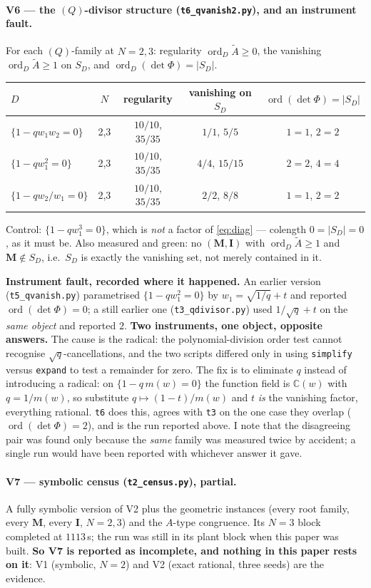 \documentclass[11pt]{article}
\theoremstyle{definition}
\newcommand{\At}{\widetilde{A}}
\newcommand{\bM}{\mathbf{M}}
\newcommand{\bI}{\mathbf{I}}
\newcommand{\ord}{\operatorname{ord}}
\begin{document}
\paragraph{V6 --- the $(Q)$-divisor structure (\texttt{t6\_qvanish2.py}), and an
instrument fault.}
For each $(Q)$-family at $N=2,3$: regularity $\ord_D\At\ge0$, the vanishing
$\ord_D\At\ge1$ on $S_D$, and $\ord_D(\det\Phi)=|S_D|$.
\begin{center}
\begin{tabular}{lcccc}
\toprule
$D$ & $N$ & regularity & vanishing on $S_D$ & $\ord(\det\Phi)=|S_D|$\\\midrule
$\{1-qw_1w_2=0\}$ & 2,3 & $10/10$, $35/35$ & $1/1$, $5/5$ & $1=1$, $2=2$\\
$\{1-qw_1^{2}=0\}$ & 2,3 & $10/10$, $35/35$ & $4/4$, $15/15$ & $2=2$, $4=4$\\
$\{1-qw_2/w_1=0\}$ & 2,3 & $10/10$, $35/35$ & $2/2$, $8/8$ & $1=1$, $2=2$\\
\bottomrule
\end{tabular}
\end{center}
Control: $\{1-qw_1^{3}=0\}$, which is \emph{not} a factor of \eqref{eq:diag} ---
colength $0=|S_D|=0$, as it must be.  Also measured and green: no $(\bM,\bI)$
with $\ord_D\At\ge1$ and $\bM\notin S_D$, i.e.\ $S_D$ is exactly the vanishing
set, not merely contained in it.

\textbf{Instrument fault, recorded where it happened.}  An earlier version
(\texttt{t5\_qvanish.py}) parametrised $\{1-qw_1^{2}=0\}$ by
$w_1=\sqrt{1/q}+t$ and reported $\ord(\det\Phi)=0$; a still earlier one
(\texttt{t3\_qdivisor.py}) used $1/\sqrt q+t$ on the \emph{same object} and
reported $2$.  \textbf{Two instruments, one object, opposite answers.}  The cause
is the radical: the polynomial-division order test cannot recognise
$\sqrt q$-cancellations, and the two scripts differed only in using
\texttt{simplify} versus \texttt{expand} to test a remainder for zero.  The fix
is to eliminate $q$ instead of introducing a radical: on $\{1-q\,m(w)=0\}$ the
function field is $\mathbb{C}(w)$ with $q=1/m(w)$, so substitute
$q\mapsto(1-t)/m(w)$ and $t$ \emph{is} the vanishing factor, everything rational.
\texttt{t6} does this, agrees with \texttt{t3} on the one case they overlap
($\ord(\det\Phi)=2$), and is the run reported above.  I note that the disagreeing
pair was found only because the \emph{same} family was measured twice by accident;
a single run would have been reported with whichever answer it gave.

\paragraph{V7 --- symbolic census (\texttt{t2\_census.py}), partial.}
A fully symbolic version of V2 plus the geometric instances (every root family,
every $\bM$, every $\bI$, $N=2,3$) and the $A$-type congruence.  Its $N=3$ block
completed at $1113$\,s; the run was still in its plant block when this paper was
built.  \textbf{So V7 is reported as incomplete, and nothing in this paper rests
on it}: V1 (symbolic, $N=2$) and V2 (exact rational, three seeds) are the
evidence.
\end{document}
